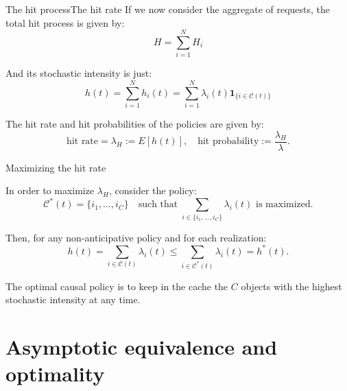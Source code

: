 \documentclass[aspectratio=169]{beamer}
\begin{document}
\begin{frame}{The hit process}{The hit rate}
	If we now consider the aggregate of requests, the \alert{total hit process} is given by:
	\begin{equation*}
		H = \sum_{i=1}^N H_i
	\end{equation*}

	And its stochastic intensity is just:
	\begin{equation*}
		h(t) = \sum_{i=1}^N h_i(t) = \sum_{i=1}^N \lambda_i(t) \mathbf{1}_{\{i\in \mathcal{C}(t)\}}
	\end{equation*}

	The hit rate and hit probabilities of the policies are given by:
	\begin{equation*}
		\text{hit rate} = \lambda_H := E[h(t)], \quad \text{hit probability} := \frac{\lambda_H}{\lambda}.
	\end{equation*}
	
\end{frame}

\begin{frame}{Maximizing the hit rate}
	
	In order to maximize $\lambda_H$, consider the policy:
	\begin{equation*}
		\mathcal{C}^*(t) = \{i_1,\ldots,i_C\} \quad \text{such that}\; \sum_{i\in\{i_1,\ldots,i_C\}} \lambda_{i}(t) \text{ is maximized.}
	\end{equation*}

	Then, for any non-anticipative policy and for each realization:
	\begin{equation*}
		h(t) = \sum_{i\in\mathcal{C}(t)} \lambda_i(t) \leqslant \sum_{i\in \mathcal{C}^*(t)} \lambda_i(t) = h^*(t).
	\end{equation*} 

	\begin{theorem}[Towsley et al. '22]
		The \alert{optimal causal policy} is to keep in the cache the $C$ objects with the \alert{highest stochastic intensity} at any time.
	\end{theorem}

\end{frame}

\section{Asymptotic equivalence and optimality}
\end{document}
